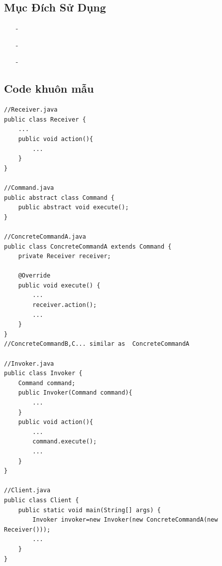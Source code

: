 \documentclass{article}
\newcommand\subpara{\fontsize{13}{13}\selectfont \fontseries{b}\selectfont}
\begin{document}
    \subsection{Mục Đích Sử Dụng}
    \begin{itemize}
        \item[-]\subpara{Khi cần tham số hóa các đối tượng theo một hành động thực hiện}
        \item[-]\subpara{Tạo và thực thi các yêu cầu vào các thời điểm khác nhau}
        \item[-]\subpara{Khi cần hỗ trợ tính năng như undo, log, callback hoặc transaction, ...}
    \end{itemize}

    \subsection{Code khuôn mẫu}
    \begin{lstlisting}
//Receiver.java
public class Receiver {
    ...
    public void action(){
        ...
    }
}

//Command.java
public abstract class Command {
    public abstract void execute();
}

//ConcreteCommandA.java
public class ConcreteCommandA extends Command {
    private Receiver receiver;

    @Override
    public void execute() {
        ...
        receiver.action();
        ...
    }
}
//ConcreteCommandB,C... similar as  ConcreteCommandA

//Invoker.java
public class Invoker {
    Command command;
    public Invoker(Command command){
        ...
    }
    public void action(){
        ...
        command.execute();
        ...
    }
}

//Client.java
public class Client {
    public static void main(String[] args) {
        Invoker invoker=new Invoker(new ConcreteCommandA(new Receiver()));
        ...
    }
}
    \end{lstlisting}
\end{document}

